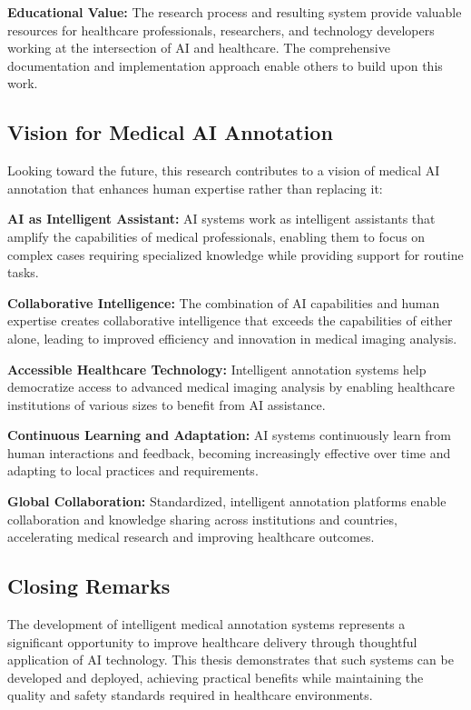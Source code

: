 \textbf{Educational Value:} The research process and resulting system provide valuable resources for healthcare professionals, researchers, and technology developers working at the intersection of AI and healthcare. The comprehensive documentation and implementation approach enable others to build upon this work.

\subsection{Vision for Medical AI Annotation}

Looking toward the future, this research contributes to a vision of medical AI annotation that enhances human expertise rather than replacing it:

\textbf{AI as Intelligent Assistant:} AI systems work as intelligent assistants that amplify the capabilities of medical professionals, enabling them to focus on complex cases requiring specialized knowledge while providing support for routine tasks.

\textbf{Collaborative Intelligence:} The combination of AI capabilities and human expertise creates collaborative intelligence that exceeds the capabilities of either alone, leading to improved efficiency and innovation in medical imaging analysis.

\textbf{Accessible Healthcare Technology:} Intelligent annotation systems help democratize access to advanced medical imaging analysis by enabling healthcare institutions of various sizes to benefit from AI assistance.

\textbf{Continuous Learning and Adaptation:} AI systems continuously learn from human interactions and feedback, becoming increasingly effective over time and adapting to local practices and requirements.

\textbf{Global Collaboration:} Standardized, intelligent annotation platforms enable collaboration and knowledge sharing across institutions and countries, accelerating medical research and improving healthcare outcomes.

\subsection{Closing Remarks}

The development of intelligent medical annotation systems represents a significant opportunity to improve healthcare delivery through thoughtful application of AI technology. This thesis demonstrates that such systems can be developed and deployed, achieving practical benefits while maintaining the quality and safety standards required in healthcare environments.

